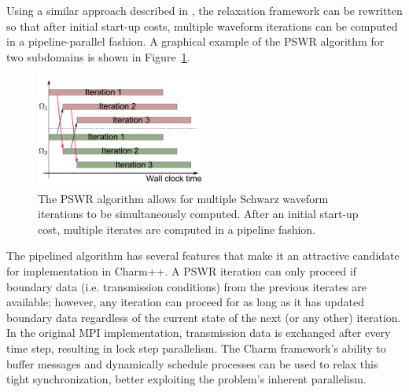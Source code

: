 \documentclass{svmult-ddm}
\begin{document}
Using a similar approach described in
\cite{ChristliebMacdonaldOng2010,MR1340665}, the relaxation framework can be
rewritten so that after initial start-up costs, multiple waveform
iterations can be computed in a pipeline-parallel fashion. A graphical
example of the PSWR algorithm for two subdomains is shown in
Figure~\ref{prop_sec:pswr_fig}.
\begin{figure}
  \centering
  \includegraphics[width=0.5\textwidth]{figure1}
  \caption{The PSWR algorithm allows for multiple Schwarz waveform
    iterations to be simultaneously computed.  After an initial
    start-up cost, multiple iterates are computed in a pipeline
    fashion.}
  \label{prop_sec:pswr_fig}
\end{figure}

The pipelined algorithm has several features that make it an
attractive candidate for implementation in Charm++.  A PSWR iteration
can only proceed if boundary data (i.e. transmission conditions) from
the previous iterates are available; however, any iteration can
proceed for as long as it has updated boundary data regardless of the
current state of the next (or any other) iteration. In the original
MPI implementation, transmission data is exchanged after every time
step, resulting in lock step parallelism. The Charm framework's ability
to buffer messages and dynamically schedule processes can be used to
relax this tight synchronization, better exploiting the problem's
inherent parallelism.
\end{document}
